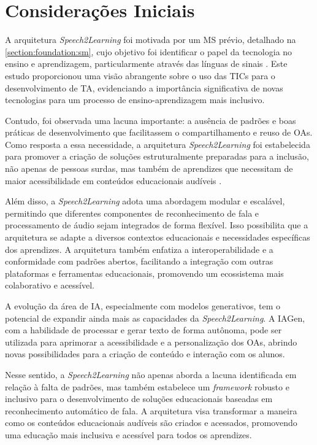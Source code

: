 \section{Considerações Iniciais}

A arquitetura \textit{Speech2Learning} foi motivada por um MS prévio, detalhado na \autoref{section:foundation:sm}, cujo objetivo foi identificar o papel da tecnologia no ensino e aprendizagem, particularmente através das línguas de sinais \cite{FalvoJr2020_SBIE, FalvoJr2020_FIE, FalvoJr2021_RENOTE}. Este estudo proporcionou uma visão abrangente sobre o uso das TICs para o desenvolvimento de TA, evidenciando a importância significativa de novas tecnologias para um processo de ensino-aprendizagem mais inclusivo.

Contudo, foi observada uma lacuna importante: a ausência de padrões e boas práticas de desenvolvimento que facilitassem o compartilhamento e reuso de OAs. Como resposta a essa necessidade, a arquitetura \textit{Speech2Learning} foi estabelecida para promover a criação de soluções estruturalmente preparadas para a inclusão, não apenas de pessoas surdas, mas também de aprendizes que necessitam de maior acessibilidade em conteúdos educacionais audíveis \cite{FalvoJr2023_HICSS}.

Além disso, a \textit{Speech2Learning} adota uma abordagem modular e escalável, permitindo que diferentes componentes de reconhecimento de fala e processamento de áudio sejam integrados de forma flexível. Isso possibilita que a arquitetura se adapte a diversos contextos educacionais e necessidades específicas dos aprendizes. A arquitetura também enfatiza a interoperabilidade e a conformidade com padrões abertos, facilitando a integração com outras plataformas e ferramentas educacionais, promovendo um ecossistema mais colaborativo e acessível.

A evolução da área de IA, especialmente com modelos generativos, tem o potencial de expandir ainda mais as capacidades da \textit{Speech2Learning}. A IAGen, com a habilidade de processar e gerar texto de forma autônoma, pode ser utilizada para aprimorar a acessibilidade e a personalização dos OAs, abrindo novas possibilidades para a criação de conteúdo e interação com os alunos.

Nesse sentido, a \textit{Speech2Learning} não apenas aborda a lacuna identificada em relação à falta de padrões, mas também estabelece um \textit{framework} robusto e inclusivo para o desenvolvimento de soluções educacionais baseadas em reconhecimento automático de fala. A arquitetura visa transformar a maneira como os conteúdos educacionais audíveis são criados e acessados, promovendo uma educação mais inclusiva e acessível para todos os aprendizes.

